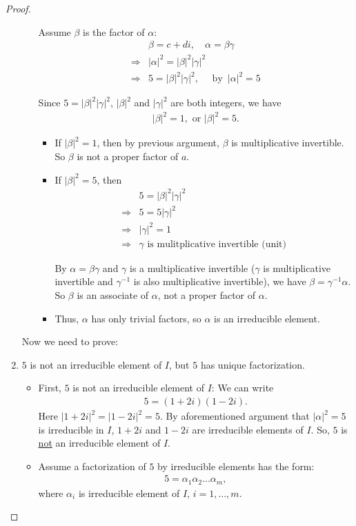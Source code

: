 \documentclass[utf8]{ctexbook}
\theoremstyle{definition}
\begin{document}
\begin{proof}
\begin{enumerate}
\begin{itemize}
{Assume $\beta$ is the factor of $\alpha$:
\begin{align*}
& \beta = c + d i, \quad \alpha = \beta \gamma \\
\Longrightarrow & |\alpha|^2 = |\beta |^2 | \gamma |^2 \\
\Longrightarrow & 5 =  |\beta |^2 | \gamma |^2, \quad \mbox{ by } \, |\alpha|^2 = 5
\end{align*}

Since $5 =  |\beta |^2 | \gamma |^2$, $|\beta |^2$ and $ | \gamma |^2$ are both integers, we have 
\begin{align*}
|\beta |^2 = 1, \mbox{ or } |\beta |^2 = 5 .
\end{align*}


\begin{itemize}
\item{If $|\beta |^2 = 1$, then by previous argument, $\beta$ is multiplicative invertible. So $\beta$ is not a proper factor of $a$.}
\item{If $|\beta |^2 = 5 $, then 
\begin{align*}
& 5 =  |\beta |^2 | \gamma |^2  \\
\Longrightarrow & 5 = 5 | \gamma |^2  \\
\Longrightarrow & | \gamma |^2 = 1 \\
\Longrightarrow & \gamma \mbox{ is mulitplicative invertible (unit)}
\end{align*}

By $\alpha = \beta \gamma $ and $\gamma$ is a multiplicative invertible ($\gamma$ is multiplicative invertible and $\gamma^{-1}$ is also multiplicative invertible), we have $\beta = \gamma^{-1} \alpha$. So $\beta$ is an associate of $\alpha$, not a proper factor of $\alpha$.
}
\item{ Thus, $\alpha$ has only trivial factors, so $\alpha$ is an irreducible element.}
\end{itemize}

}
\end{itemize}


Now we need to prove:
\item{$5$ is not an irreducible element of $I$, but $5$ has unique factorization.}
\begin{itemize}
\item{First, $5$ is not an irreducible element of $I$:
We can write
\begin{align*}
5 = (1 + 2 i ) (1 - 2 i ) .
\end{align*}
Here $|1 + 2i|^2 = | 1-2i|^2 = 5$. By aforementioned argument that $|\alpha|^2 = 5$ is irreducible in $I$, $1 + 2i$ and $1 - 2i$ are irreducible elements of $I$. So, $5 $ is \underline{not} an irreducible element of $I$.}
\item{Assume a factorization of $5$ by irreducible elements has the form:
\begin{align*}
5 = \alpha_1 \alpha_2 \ldots \alpha_m ,
\end{align*}
where $\alpha_i$ is irreducible element of $I$, $i = 1, \ldots, m$.

}
\end{itemize}
\end{enumerate}
\end{proof}
\end{document}
